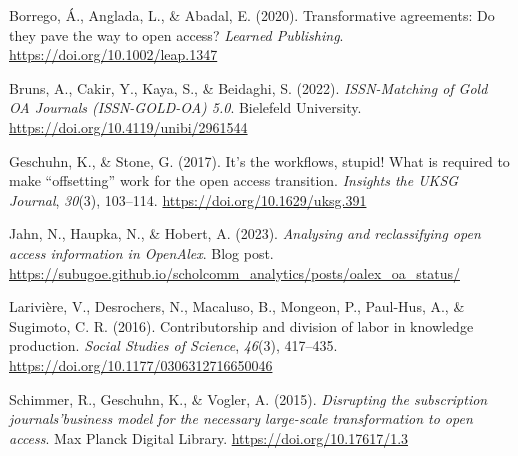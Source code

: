 \documentclass[a4paper,man,floatsintext,longtable,noextraspace,12pt]{apa6}
\newenvironment{CSLReferences}%
  {}%
  {\par}
\begin{document}
\hypertarget{refs}{}
\begin{CSLReferences}{1}{0}
\leavevmode{}%
Borrego, Á., Anglada, L., \& Abadal, E. (2020). Transformative
agreements: Do they pave the way to open access? \emph{Learned
Publishing}. \url{https://doi.org/10.1002/leap.1347}

\leavevmode{}%
Bruns, A., Cakir, Y., Kaya, S., \& Beidaghi, S. (2022).
\emph{{ISSN-Matching of Gold OA Journals (ISSN-GOLD-OA) 5.0}}. Bielefeld
University. \url{https://doi.org/10.4119/unibi/2961544}

\leavevmode{}%
Geschuhn, K., \& Stone, G. (2017). It's the workflows, stupid! What is
required to make {``offsetting''} work for the open access transition.
\emph{Insights the {UKSG} Journal}, \emph{30}(3), 103--114.
\url{https://doi.org/10.1629/uksg.391}

\leavevmode{}%
Jahn, N., Haupka, N., \& Hobert, A. (2023). \emph{Analysing and
reclassifying open access information in OpenAlex}. Blog post.
\url{https://subugoe.github.io/scholcomm_analytics/posts/oalex_oa_status/}

\leavevmode{}%
Larivière, V., Desrochers, N., Macaluso, B., Mongeon, P., Paul-Hus, A.,
\& Sugimoto, C. R. (2016). Contributorship and division of labor in
knowledge production. \emph{Social Studies of Science}, \emph{46}(3),
417--435. \url{https://doi.org/10.1177/0306312716650046}

\leavevmode{}%
Schimmer, R., Geschuhn, K., \& Vogler, A. (2015). \emph{{Disrupting the
subscription journals'business model for the necessary large-scale
transformation to open access}}. Max Planck Digital Library.
\url{https://doi.org/10.17617/1.3}

\end{CSLReferences}
\end{document}
